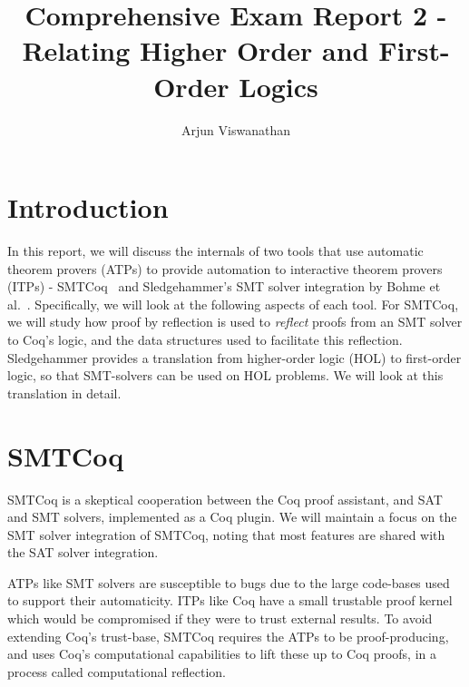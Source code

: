 \documentclass{article}
\begin{document}
\title{Comprehensive Exam Report 2 - Relating Higher Order and First-Order Logics}
\author{Arjun Viswanathan}
\date{}
\maketitle

\section{Introduction}
\label{sec:intro}
	In this report, we will discuss the 
	internals of two tools that use 
	automatic theorem provers (ATPs) to 
	provide automation to interactive 
	theorem provers (ITPs) - 
	SMTCoq~\cite{DBLP:phd/hal/Keller13} 
	and Sledgehammer's SMT solver 
	integration by Bohme et al.~\cite{bohme}. 
	Specifically, we will look at the 
	following aspects of each tool. For 
	SMTCoq, we will study 
	how proof by reflection is used to 
	\textit{reflect} proofs from an SMT 
	solver to Coq's logic, and the data 
	structures used to facilitate this 
	reflection.	Sledgehammer provides a 
	translation from higher-order logic 
	(HOL) to first-order logic, so that 
	SMT-solvers can be used on HOL problems. 
	We will look at this translation 
	in detail.

\section{SMTCoq}
\label{sec:smtcoq}
	SMTCoq is a skeptical cooperation 
	between the Coq proof assistant, and 
	SAT and SMT solvers, implemented as a 
	Coq plugin. We will maintain a focus 
	on the SMT solver integration of 
	SMTCoq, noting that most features are 
	shared with the SAT	solver integration.
	
	ATPs like SMT solvers are susceptible 
	to bugs due to the large code-bases 
	used to support	their automaticity. 
	ITPs like Coq have a small trustable 
	proof kernel which would be 
	compromised if they were to trust
	external results. To avoid extending 
	Coq's trust-base, SMTCoq requires the 
	ATPs to be proof-producing, and uses 
	Coq's computational capabilities 
	to lift these up to Coq proofs, in a 
	process called computational 
	reflection. 
	
\end{document}
